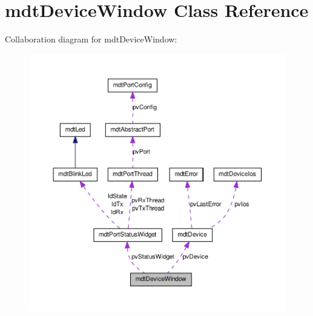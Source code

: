 \hypertarget{classmdt_device_window}{
\section{mdtDeviceWindow Class Reference}
\label{classmdt_device_window}
}


Collaboration diagram for mdtDeviceWindow:\nopagebreak
\begin{figure}[H]
\begin{center}
\leavevmode
\includegraphics[width=400pt]{classmdt_device_window__coll__graph}
\end{center}
\end{figure}
